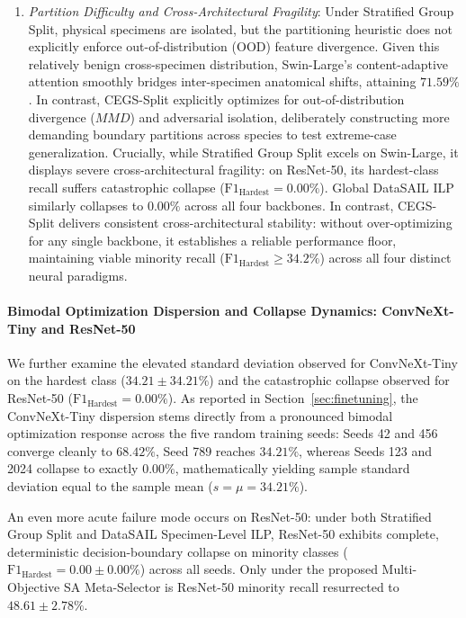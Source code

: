 \documentclass[a4paper,fleqn]{cas-sc}
\begin{document}
\begin{enumerate}
\item \emph{Partition Difficulty and Cross-Architectural Fragility}: Under \textsf{Stratified Group Split}, physical specimens are isolated, but the partitioning heuristic does not explicitly enforce out-of-distribution (OOD) feature divergence. Given this relatively benign cross-specimen distribution, Swin-Large's content-adaptive attention smoothly bridges inter-specimen anatomical shifts, attaining $71.59\%$. In contrast, CEGS-Split explicitly optimizes for out-of-distribution divergence ($MMD$) and adversarial isolation, deliberately constructing more demanding boundary partitions across species to test extreme-case generalization. Crucially, while \textsf{Stratified Group Split} excels on Swin-Large, it displays severe cross-architectural fragility: on ResNet-50, its hardest-class recall suffers catastrophic collapse ($\mathrm{F1}_{\text{Hardest}} = 0.00\%$). Global DataSAIL ILP similarly collapses to $0.00\%$ across all four backbones. In contrast, CEGS-Split delivers consistent cross-architectural stability: without over-optimizing for any single backbone, it establishes a reliable performance floor, maintaining viable minority recall ($\mathrm{F1}_{\text{Hardest}} \ge 34.2\%$) across all four distinct neural paradigms.
\end{enumerate}

\paragraph{Bimodal Optimization Dispersion and Collapse Dynamics: ConvNeXt-Tiny and ResNet-50}
We further examine the elevated standard deviation observed for ConvNeXt-Tiny on the hardest class ($34.21 \pm 34.21\%$) and the catastrophic collapse observed for ResNet-50 ($\mathrm{F1}_{\text{Hardest}} = 0.00\%$). As reported in Section~\ref{sec:finetuning}, the ConvNeXt-Tiny dispersion stems directly from a pronounced bimodal optimization response across the five random training seeds: Seeds 42 and 456 converge cleanly to $68.42\%$, Seed 789 reaches $34.21\%$, whereas Seeds 123 and 2024 collapse to exactly $0.00\%$, mathematically yielding sample standard deviation equal to the sample mean ($s = \mu = 34.21\%$). 

An even more acute failure mode occurs on ResNet-50: under both \textsf{Stratified Group Split} and \textsf{DataSAIL Specimen-Level ILP}, ResNet-50 exhibits complete, deterministic decision-boundary collapse on minority classes ($\mathrm{F1}_{\text{Hardest}} = 0.00 \pm 0.00\%$) across all seeds. Only under the proposed Multi-Objective SA Meta-Selector is ResNet-50 minority recall resurrected to $48.61 \pm 2.78\%$.
\end{document}
